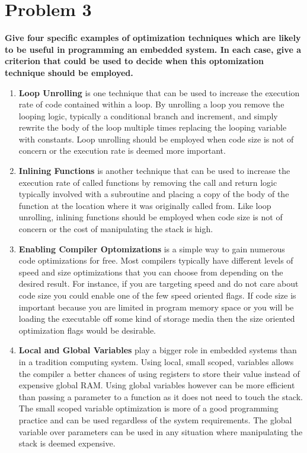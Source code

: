 \documentclass{article}
\begin{document}
\section*{Problem 3}
\textbf{Give four specific examples of optimization techniques which are likely
    to be useful in programming an embedded system. In each case, give a
    criterion that could be used to decide when this optomization technique
should be employed.}
\begin{enumerate}
    \item \textbf{Loop Unrolling} is one technique that can be used to increase the execution rate of code contained within a loop.
        By unrolling a loop you remove the looping logic, typically a conditional branch and increment, and simply rewrite the
        body of the loop multiple times replacing the looping variable with constants. Loop unrolling should be employed when code
        size is not of concern or the execution rate is deemed more important.
    \item \textbf{Inlining Functions} is another technique that can be used to increase the execution rate of called functions by
        removing the call and return logic typically involved with a subroutine and placing a copy of the body of the function
        at the location where it was originally called from. Like loop unrolling, inlining functions should be employed when code
        size is not of concern or the cost of manipulating the stack is high.
    \item \textbf{Enabling Compiler Optomizations} is a simple way to gain numerous code optimizations for free. Most compilers
        typically have different levels of speed and size optimizations that you can choose from depending on the desired result.
        For instance, if you are targeting speed and do not care about code size you could enable one of the few speed oriented flags.
        If code size is important because you are limited in program memory space or you will be loading the executable off some kind
        of storage media then the size oriented optimization flags would be desirable.
    \item \textbf{Local and Global Variables} play a bigger role in embedded systems than in a tradition computing system. Using local, small
        scoped, variables allows the compiler a better chances of using registers to store their value instead of expensive global RAM. Using global
        variables however can be more efficient than passing a parameter to a function as it does not need to touch the stack. The small scoped variable
        optimization is more of a good programming practice and can be used regardless of the system requirements. The global variable over parameters
        can be used in any situation where manipulating the stack is deemed expensive.
\end{enumerate}
\end{document}
